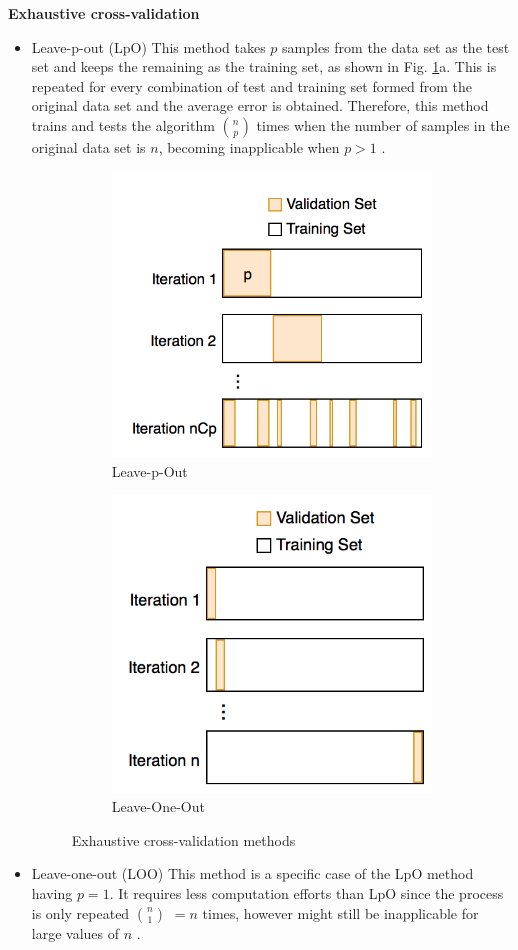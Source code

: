 \noindent\textbf{Exhaustive cross-validation}
\begin{itemize}
\item Leave-p-out (LpO) \newline 
This method takes \(p\) samples from the data set as the test set and keeps the remaining as the training set, as shown in Fig. \ref{fig:leavep}a. This is repeated for every combination of test and training set formed from the original data set and the average error is obtained. Therefore, this method trains and tests the algorithm \(n\choose p\) times when the number of samples in the original data set is \(n\), becoming inapplicable when \(p>1\) \cite{arlot2010survey}.

\begin{figure}
\centering
\begin{subfigure}
  \centering
  \includegraphics[width=.4\linewidth]{leavep.png}
  \caption{Leave-p-Out}
  \end{subfigure}
 \begin{subfigure}
  \centering
  \includegraphics[width=.37\linewidth]{leave1.png}
  \caption{Leave-One-Out}
  \end{subfigure}
  \caption{Exhaustive cross-validation methods}
  \label{fig:leavep}
\end{figure}

\item Leave-one-out (LOO)\newline 
This method is a specific case of the LpO method having \(p=1\). It requires less computation efforts than LpO since the process is only repeated \(n \choose 1\) \(= n\) times, however might still be inapplicable for large values of \(n\) \cite{arlot2010survey}. 
\end{itemize}

